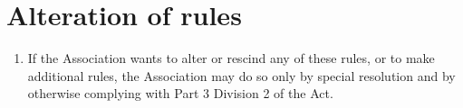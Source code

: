 \hypertarget{alteration-of-rules}{%
\section{Alteration of rules}\label{alteration-of-rules}}

\begin{enumerate}

\item If the Association wants to alter or rescind any of these rules, or to make additional rules, the Association may do so only by special resolution and by otherwise complying with Part 3 Division 2 of the Act.
\end{enumerate}
